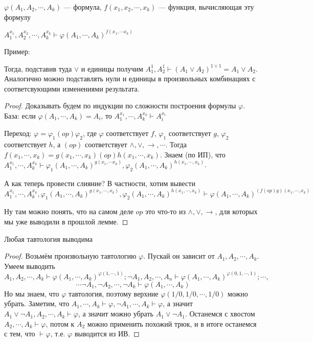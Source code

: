 \begin{lemma}
	$\varphi(A_1, A_2, \cdots, A_k)$ --- формула, $f(x_1, x_2, \cdots, x_k)$ --- функция, вычисляющая эту формулу

	$A_1^{x_1}, A_2^{x_2}, \cdots, A_k^{x_k} \vdash \varphi(A_1, \cdots, A_k)^{f(x_1, \cdots x_k)}$

	Пример:


	Тогда, подставив туда $\lor$ и единицы  получим $A_1^1, A_2^1 \vdash (A_1 \lor A_2)^{1 \lor 1} = A_1 \lor A_2$. Аналогично можно подставлять нули и единицы в произвольных комбинациях с соответсвующими изменениями результата.
\end{lemma}
\begin{proof}
	Доказывать будем по индукции по сложности построения формулы $\varphi$. База: если $\varphi(A_1, \cdots, A_k) = A_i$, то $A_1^{x_1}, \cdots, A_k^{x_k} \vdash A_i^{x_i}$

	Переход: $\varphi = \varphi_1 (op) \varphi_2$, где $\varphi$ соответствует $f$, $\varphi_1$ соответствует $g$, $\varphi_2$ соответствует $h$, а $(op)$  соответствует $\land, \lor, \to, \cdots$. Тогда $f(x_1, \cdots, x_k) = g(x_1, \cdots, x_k) (op) h(x_1, \cdots, x_k)$. Знаем (по ИП), что $A_1^{x_1}, \cdots, A_k^{x_k} \vdash \varphi_1(A_1, \cdots, A_k)^{g(x_1, \cdots x_k)}, \varphi_2(A_1, \cdots, A_k)^{h(x_1, \cdots, x_k)}$. 

	А как теперь провести слияние? В частности, хотим вывести 
	$$
	A_1^{x_1}, \cdots, A_k^{x_k}, \varphi_1(A_1, \cdots, A_k)^{g(x_1, \cdots, x_k)}, \varphi_2(A_1, \cdots, A_k)^{h(x_1, \cdots, x_k)} \vdash \varphi(A_1, \cdots, A_k)^{(f (op) g)(x_1, \cdots, x_k)}
	$$

	Ну там можно понять, что на самом деле $op$ это что-то из $\land, \lor, \to$, для которых мы уже выводили в прошлой лемме.
\end{proof}

\begin{theorem}
	Любая тавтология выводима
\end{theorem}
\begin{proof}
	Возьмём произвольную тавтологию $\varphi$. Пускай он зависит от $A_1, A_2, \cdots, A_k$. Умеем выводить 
	{
		\small
	$$
	A_1, A_2, \cdots, A_k \vdash \varphi(A_1, \cdots, A_k)^{\varphi(1, \cdots, 1)}; \lnot A_1, A_2, \cdots, A_n \vdash \varphi(A_1, \cdots, A_k)^{\varphi(0, 1, \cdots, 1)}; \cdots,
	$$
	$$
	\cdots \lnot A_1, \lnot A_2, \cdots, \lnot A_k \vdash \varphi(A_1, \cdots, A_k)
	$$
}
	Но мы знаем, что $\varphi$ тавтология, поэтому верхние $\varphi(1/0, 1/0, \cdots, 1/0)$ можно убрать. Заметим, что $A_1, \cdots, A_k \vdash \varphi, \lnot A_1, \cdots, A_k \vdash \varphi$, а значит $A_1 \lor \lnot A_1, A_2, \cdots, A_k \vdash \varphi$, а значит можно убрать $A_1 \lor \lnot A_1$. Останемся с хвостом $A_2, \cdots, A_k \vdash \varphi$, потом к $A_2$ можно применить похожий трюк, и в итоге останемся с тем, что $\vdash \varphi$, т.е. $\varphi$ выводится из ИВ. 
\end{proof}


